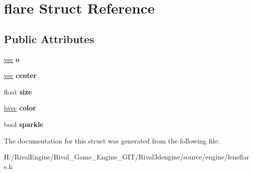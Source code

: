 \hypertarget{structflare}{}\section{flare Struct Reference}
\label{structflare}
\subsection*{Public Attributes}
\begin{DoxyCompactItemize}
\item 
\mbox{\label{structflare_a89e957da6aca75ee9cfdf73a6ae136bd}} 
\hyperlink{structvec}{vec} {\bfseries o}
\item 
\mbox{\label{structflare_a0c9e10d342303a31b7a8739cc989af33}} 
\hyperlink{structvec}{vec} {\bfseries center}
\item 
\mbox{\label{structflare_adb73b49f163d75603ef91e90b0b9a122}} 
float {\bfseries size}
\item 
\mbox{\label{structflare_a47a882e32bed95aa29077e5c406eedcf}} 
\hyperlink{structbvec}{bvec} {\bfseries color}
\item 
\mbox{\label{structflare_af98f143a318885ea5f64fcd6f99a282f}} 
bool {\bfseries sparkle}
\end{DoxyCompactItemize}


The documentation for this struct was generated from the following file\+:\begin{DoxyCompactItemize}
\item 
H\+:/\+Rival\+Engine/\+Rival\+\_\+\+Game\+\_\+\+Engine\+\_\+\+G\+I\+T/\+Rival3dengine/source/engine/lensflare.\+h\end{DoxyCompactItemize}
